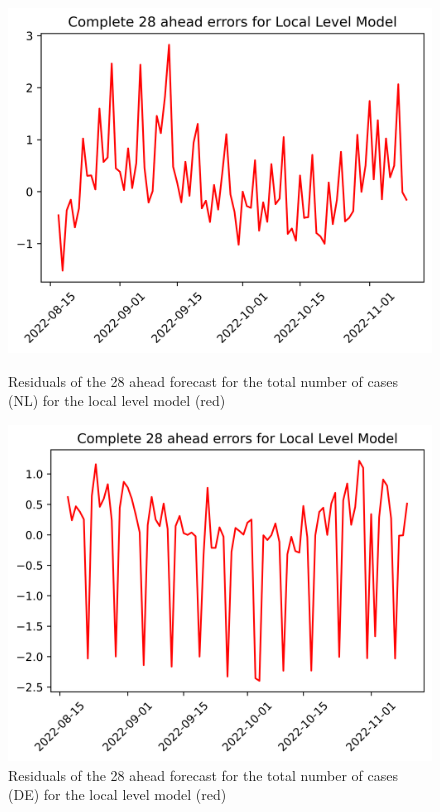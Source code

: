 \begin{figure}

\begin{minipage}{.45\textwidth}
  \centering
  \includegraphics[width=\linewidth]{pics/28_ah/28_ahead_errors_Local Level Model.png}
  \caption{Residuals of the 28 ahead forecast for the total number of cases (NL) for the local level model (red)}
  \label{fig:tot_cases_error_28_LLM}
\end{minipage}
\begin{minipage}{.45\textwidth}
  \centering
  \includegraphics[width=\linewidth]{pics/28_ah/DE_28_ahead_errors_Local Level Model.png}
  \caption{Residuals of the 28 ahead forecast for the total number of cases (DE) for the local level model (red)}
  \label{fig:tot_cases_error_28_LLM_DE}
\end{minipage}

\end{figure}
